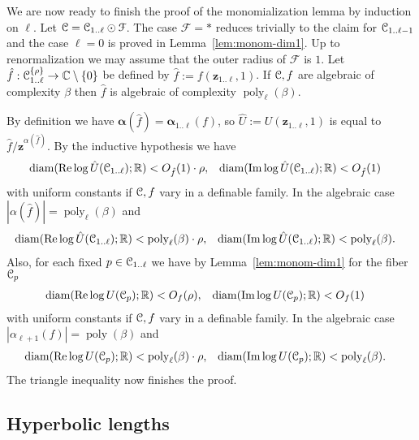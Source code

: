 \documentclass[reqno]{amsart}
\renewcommand\~[1]{\widetilde{#1}}
\def\Re{\operatorname{Re}} \def\Im{\operatorname{Im}}
\def\diam{\operatorname{diam}} \def\ord{\operatorname{ord}}
\def\poly{\operatorname{poly}} \def\J{\operatorname{J}}
\def\cF{{\mathcal F}} \def\cL{{\mathcal L}} \def\cR{{\mathcal R}}
\def\vz{{\mathbf z}}
\def\valpha{{\boldsymbol\alpha}}
\def\he#1{{\{#1\}}}
\def\hrho{{\he\rho}}
\begin{document}
We are now ready to finish the proof of the monomialization lemma by
induction on $\ell$. Let $\cC=\cC_{1..\ell}\odot\cF$. The case $\cF=*$
reduces trivially to the claim for ${\mathcal C}_{1..\ell-1}$ and the case
$\ell=0$ is proved in Lemma~\ref{lem:monom-dim1}. Up to
renormalization we may assume that the outer radius of $\cF$ is $1$.
Let $\hat f:\cC_{1..\ell}^\hrho\to\C\setminus\{0\}$ be defined by
$\hat f:=f(\vz_{1..\ell},1)$. If ${\mathcal C},f$ are algebraic of complexity
$\beta$ then $\hat f$ is algebraic of complexity $\poly_\ell(\beta)$.

By definition we have $\valpha(\hat f)=\valpha_{1..\ell}(f)$, so
$\hat U:=U(\vz_{1..\ell},1)$ is equal to
$\hat f/\vz^{\alpha(\hat f)}$. By the inductive hypothesis we have
\begin{align}
  \diam(\Re\log \hat U(\cC_{1..\ell});\R) &< O_{\hat f}(1)\cdot\rho, & \diam(\Im\log \hat U(\cC_{1..\ell});\R) &< O_{\hat f}(1)
\end{align}
with uniform constants if ${\mathcal C},f$ vary in a definable family. In the
algebraic case $|\alpha(\hat f)|=\poly_\ell(\beta)$ and
\begin{align}
  \diam(\Re\log \hat U(\cC_{1..\ell});\R) &< \poly_\ell(\beta)\cdot\rho, & \diam(\Im\log \hat U(\cC_{1..\ell});\R) &< \poly_\ell(\beta).
\end{align}
Also, for each fixed $p\in{\mathcal C}_{1..\ell}$ we have by
Lemma~\ref{lem:monom-dim1} for the fiber ${\mathcal C}_p$
\begin{align}
  \diam(\Re\log U(\cC_p);\R) &< O_f(\rho), & \diam(\Im\log U(\cC_p);\R) &< O_f(1)
\end{align}
with uniform constants if ${\mathcal C},f$ vary in a definable family. In the
algebraic case $|\alpha_{\ell+1}(f)|=\poly(\beta)$ and
\begin{align}
  \diam(\Re\log U(\cC_p);\R) &< \poly_\ell(\beta)\cdot\rho, & \diam(\Im\log U(\cC_p);\R) &< \poly_\ell(\beta).
\end{align}
The triangle inequality now finishes the proof.



\subsection{Hyperbolic lengths}
\label{sec:explicit-consts}
\end{document}
